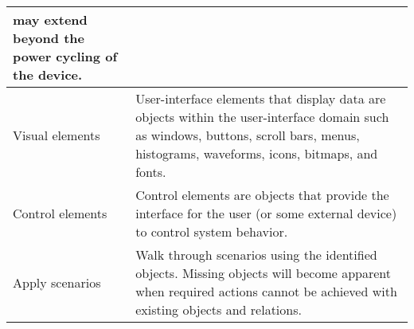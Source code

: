 \begin{table}[h]
\begin{center}
\begin{tabular}{|p{3.5cm}|p{12.0cm}|}
may extend beyond the power cycling of the device. \\
\hline
Visual elements &  User-interface elements that display data are objects within the 
user-interface domain such as windows, buttons, scroll bars, menus, histograms, 
waveforms, icons, bitmaps, and fonts. \\
\hline
Control elements &  Control elements are objects that provide the interface
for the user (or some external device) to control system behavior. \\
\hline
Apply scenarios &  Walk through scenarios using the identified objects. Missing objects
will become apparent when required actions 
cannot be achieved with existing objects and relations. \\
\hline
\hline
\end{tabular}
\end{center}
\end{table}

